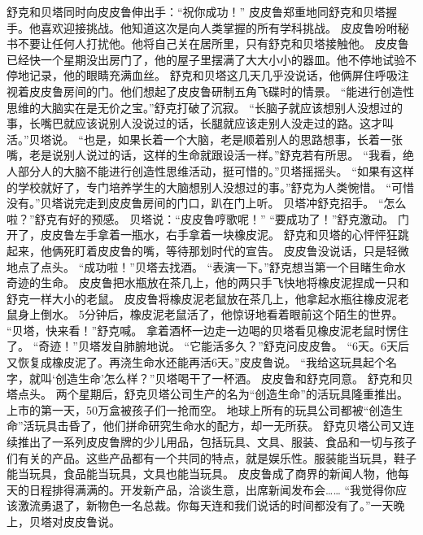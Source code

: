 \documentclass[a4paper,12pt,UTF8,twoside]{ctexbook}
\begin{document}
        舒克和贝塔同时向皮皮鲁伸出手：“祝你成功！” 
        皮皮鲁郑重地同舒克和贝塔握手。他喜欢迎接挑战。他知道这次是向人类掌握的所有学科挑战。 
        皮皮鲁吩咐秘书不要让任何人打扰他。他将自己关在居所里，只有舒克和贝塔接触他。 
        皮皮鲁已经快一个星期没出房门了，他的屋子里摆满了大大小小的器皿。他不停地试验不停地记录，他的眼睛充满血丝。 
        舒克和贝塔这几天几乎没说话，他俩屏住呼吸注视着皮皮鲁房间的门。他们想起了皮皮鲁研制五角飞碟时的情景。 
        “能进行创造性思维的大脑实在是无价之宝。”舒克打破了沉寂。 
        “长脑子就应该想别人没想过的事，长嘴巴就应该说别人没说过的话，长腿就应该走别人没走过的路。这才叫活。”贝塔说。 
        “也是，如果长着一个大脑，老是顺着别人的思路想事，长着一张嘴，老是说别人说过的话，这样的生命就跟设活一样。”舒克若有所思。 
        “我看，绝人部分人的大脑不能进行创造性思维活动，挺可惜的。”贝塔摇摇头。 
        “如果有这样的学校就好了，专门培养学生的大脑想别人没想过的事。”舒克为人类惋惜。 
        “可惜没有。”贝塔说完走到皮皮鲁房间的门口，趴在门上听。 
        贝塔冲舒克招手。 
        “怎么啦？”舒克有好的预感。 
        贝塔说：“皮皮鲁哼歌呢！” 
        “要成功了！”舒克激动。 
        门开了，皮皮鲁左手拿着一瓶水，右手拿着一块橡皮泥。 
        舒克和贝塔的心怦怦狂跳起来，他俩死盯着皮皮鲁的嘴，等待那划时代的宣告。 
        皮皮鲁没说话，只是轻微地点了点头。 
        “成功啦！”贝塔去找酒。 
        “表演一下。”舒克想当第一个目睹生命水奇迹的生命。 
        皮皮鲁把水瓶放在茶几上，他的两只手飞快地将橡皮泥捏成一只和舒克一样大小的老鼠。 
        皮皮鲁将橡皮泥老鼠放在茶几上，他拿起水瓶往橡皮泥老鼠身上倒水。 
        5分钟后，橡皮泥老鼠活了，他惊讶地看着眼前这个陌生的世界。 
        “贝塔，快来看！”舒克喊。 
        拿着酒杯一边走一边喝的贝塔看见橡皮泥老鼠时愣住了。 
        “奇迹！”贝塔发自肺腑地说。 
        “它能活多久？”舒克问皮皮鲁。 
        “6天。6天后又恢复成橡皮泥了。再浇生命水还能再活6天。”皮皮鲁说。 
        “我给这玩具起个名字，就叫‘创造生命’怎么样？”贝塔喝干了一杯酒。 
        皮皮鲁和舒克同意。 
        舒克和贝塔点头。 
        两个星期后，舒克贝塔公司生产的名为“创造生命”的活玩具隆重推出。上市的第一天，50万盒被孩子们一抢而空。 
        地球上所有的玩具公司都被“创造生命”活玩具击昏了，他们拼命研究生命水的配方，却一无所获。 
        舒克贝塔公司又连续推出了一系列皮皮鲁牌的少儿用品，包括玩具、文具、服装、食品和一切与孩子们有关的产品。这些产品都有一个共同的特点，就是娱乐性。服装能当玩具，鞋子能当玩具，食品能当玩具，文具也能当玩具。 
        皮皮鲁成了商界的新闻人物，他每天的日程排得满满的。开发新产品，洽谈生意，出席新闻发布会…… 
        “我觉得你应该激流勇退了，新物色一名总裁。你每天连和我们说话的时间都没有了。”一天晚上，贝塔对皮皮鲁说。 
\end{document}
